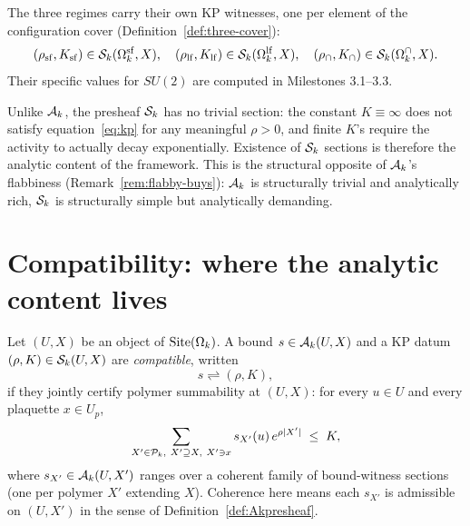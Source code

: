 The three regimes carry their own KP witnesses, one per element of the configuration cover (Definition~\ref{def:three-cover}):
\begin{equation*}
  (\rho_{\mathrm{sf}}, K_{\mathrm{sf}}) \in \mathcal{S}_k(\Omega_k^{\mathrm{sf}}, X), \quad
  (\rho_{\mathrm{lf}}, K_{\mathrm{lf}}) \in \mathcal{S}_k(\Omega_k^{\mathrm{lf}}, X), \quad
  (\rho_{\cap}, K_{\cap}) \in \mathcal{S}_k(\Omega_k^{\cap}, X).
\end{equation*}
Their specific values for $SU(2)$ are computed in Milestones 3.1--3.3.

\begin{remark}
Unlike $\mathcal{A}_k$, the presheaf $\mathcal{S}_k$ has no trivial section: the constant $K \equiv \infty$ does not satisfy equation~\eqref{eq:kp} for any meaningful $\rho > 0$, and finite $K$'s require the activity to actually decay exponentially.  Existence of $\mathcal{S}_k$ sections is therefore the analytic content of the framework.  This is the structural opposite of $\mathcal{A}_k$'s flabbiness (Remark~\ref{rem:flabby-buys}): $\mathcal{A}_k$ is structurally trivial and analytically rich, $\mathcal{S}_k$ is structurally simple but analytically demanding.
\end{remark}

\begin{mainfigure}
\centering

\caption{The three-region cover of $\Omk$ — small-field $\Omksf$
(blue), large-field $\Omklf$ (red), buffer $\Omkcap$ (green) — and
the two coupled sheaves $\Acal_k, \Scal_k$ on each region.  The
dashed domination-gluing arrow on the buffer overlap captures the
compatibility predicate of the next section: a section $s^\cap$ on
the buffer must dominate both the small-field and large-field
sections on their respective patches.}
\label{fig:sheaf-gluing}
\end{mainfigure}

\section{Compatibility: where the analytic content lives}
\label{sec:compat}

\begin{definition}
\label{def:compatibility}
Let $(U, X)$ be an object of $\mathrm{Site}(\Omega_k)$.  A bound $s \in \mathcal{A}_k(U, X)$ and a KP datum $(\rho, K) \in \mathcal{S}_k(U, X)$ are \emph{compatible}, written
\begin{equation*}
  s \rightleftharpoons (\rho, K),
\end{equation*}
if they jointly certify polymer summability at $(U, X)$: for every $u \in U$ and every plaquette $x \in U_p$,
\begin{equation}
  \label{eq:compatibility}
  \sum_{X' \in \mathcal{P}_k,\ X' \supseteq X,\ X' \ni x} s_{X'}(u)\, e^{\rho |X'|} \;\le\; K,
\end{equation}
where $s_{X'} \in \mathcal{A}_k(U, X')$ ranges over a coherent family of bound-witness sections (one per polymer $X'$ extending $X$).  Coherence here means each $s_{X'}$ is admissible on $(U, X')$ in the sense of Definition~\ref{def:Akpresheaf}.
\end{definition}

